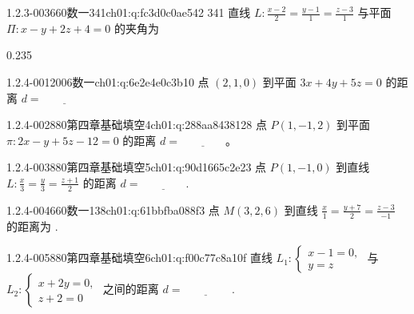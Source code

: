\begin{q}{1.2.3-003}{660数一341}{ch01:q:fc3d0c0ae542}
341 直线 $L:\frac{x-2}{2}=\frac{y-1}{1}=\frac{z-3}{1}$ 与平面 $\Pi:x-y+2z+4=0$ 的夹角为
\begin{opts}{0.235}
\hfill{}\hfill{}\hfill{}
\end{opts}
\end{q}

\par\addvspace{2.4ex}\noindent
\begin{minipage}{\linewidth}

\begin{q}{1.2.4-001}{2006数一}{ch01:q:6e2e4e0c3b10}
点 $(2,1,0)$ 到平面 $3x+4y+5z=0$ 的距离 $d = \underline{\hspace{4em}}$
\end{q}
\end{minipage}


\begin{q}{1.2.4-002}{880第四章基础填空4}{ch01:q:288aa8438128}
点 $P(1,-1,2)$ 到平面 $\pi: 2x-y+5z-12=0$ 的距离 $d=\underline{\hspace{4em}}$。
\end{q}

\begin{q}{1.2.4-003}{880第四章基础填空5}{ch01:q:90d1665c2e23}
点 $P(1,-1,0)$ 到直线 $L:\frac{x}{3}=\frac{y}{3}=\frac{z+1}{2}$ 的距离 $d=\underline{\hspace{4em}}$.
\end{q}

\begin{q}{1.2.4-004}{660数一138}{ch01:q:61bbfba088f3}
点 $M(3,2,6)$ 到直线 $\frac{x}{1}=\frac{y+7}{2}=\frac{z-3}{-1}$ 的距离为 \underline{\hspace{4em}}.
\end{q}

\begin{q}{1.2.4-005}{880第四章基础填空6}{ch01:q:f00c77c8a10f}
直线 $L_1:\begin{cases} x-1=0, \\ y=z \end{cases}$ 与 $L_2:\begin{cases} x+2y=0, \\ z+2=0 \end{cases}$ 之间的距离 $d=\underline{\hspace{4em}}$ .
\end{q}

